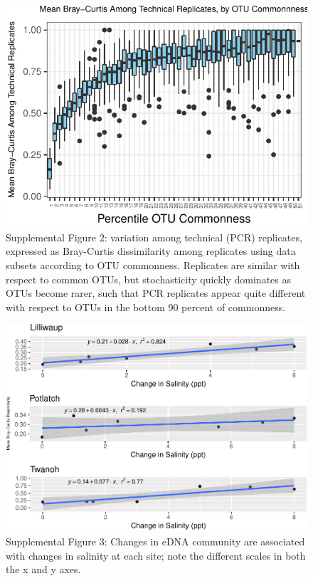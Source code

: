 \documentclass[fleqn,10pt,lineno]{wlpeerj} %
\begin{document}
\begin{figure}[!ht]

{\centering \includegraphics{20171117_Tides_and_eDNA_RPK_files/figure-latex/stochastic_variation_rareTail-1} 

}

\caption*{\label{fig:SuppFig2}Supplemental Figure 2: variation among technical (PCR) replicates, expressed as Bray-Curtis dissimilarity among replicates using data subsets according to OTU commonness. Replicates are similar with respect to common OTUs, but stochasticity quickly dominates as OTUs become rarer, such that PCR replicates appear quite different with respect to OTUs in the bottom 90 percent of commonness.}\label{fig:stochastic_variation_rareTail}
\end{figure}

\begin{figure}[!ht]

{\centering \includegraphics{20171117_Tides_and_eDNA_RPK_files/figure-latex/salinity_BC_correlations-1} 

}

\caption*{\label{fig:SupplFig3}Supplemental Figure 3: Changes in eDNA community are associated with changes in salinity at each site; note the different scales in both the x and y axes.}\label{fig:salinity_BC_correlations}
\end{figure}
\end{document}
